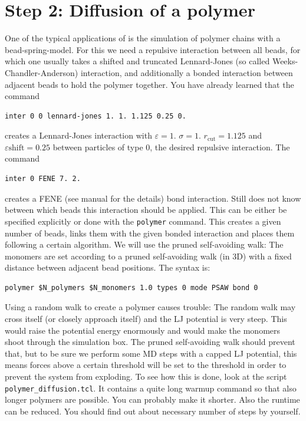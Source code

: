
\section{Step 2: Diffusion of a polymer}
One of the typical applications of \ES{} is the simulation of polymer chains 
with a bead-spring-model. For this we need a repulsive interaction
between all beads, for which one usually takes a shifted and truncated
Lennard-Jones (so called Weeks-Chandler-Anderson) interaction, 
and additionally a bonded interaction between 
adjacent beads to hold the polymer together. You have already learned
that the command
{\vspace{0,2cm}\small
\begin{lstlisting}[numbers=none]
inter 0 0 lennard-jones 1. 1. 1.125 0.25 0. 
\end{lstlisting}\vspace{0,2cm}
}
creates a Lennard-Jones interaction with $\varepsilon=1.$ $\sigma=1.$
$r_\text{cut} = 1.125$ and $\varepsilon\text{shift}=0.25$ between particles
of type 0, the desired 
repulsive interaction. The command
{\vspace{0,2cm}\small
\begin{lstlisting}[numbers=none]
inter 0 FENE 7. 2. 
\end{lstlisting}\vspace{0,2cm}
}
creates a FENE (see \ES{} manual for the details) bond interaction. Still \ES{}
does not know between which beads this interaction should be applied.
This can be either be specified explicitly or done with the \lstinline|polymer|
command. This creates a given number of beads, links them with the given
bonded interaction and places them following a certain algorithm. We will
use the pruned self-avoiding walk: The monomers are set according 
to a pruned self-avoiding walk (in 3D) with a
fixed distance between adjacent bead positions. The syntax is:
{\vspace{0,2cm}\small
\begin{lstlisting}[numbers=none]
polymer $N_polymers $N_monomers 1.0 types 0 mode PSAW bond 0 
\end{lstlisting}\vspace{0,2cm}
}
Using a random walk to create a polymer causes trouble: The random walk may 
cross itself (or closely approach itself) and the LJ potential is very
steep. This would raise the potential energy enormously and would make
the monomers shoot through the simulation box. The pruned self-avoiding
walk should prevent that, but to be sure
we perform some MD steps with a capped LJ potential, this means 
forces above a certain threshold will be set to the threshold in order to prevent
the system from exploding. To see how this is done, look at the script 
\lstinline|polymer_diffusion.tcl|.
It contains a quite long warmup command so that also longer polymers
are possible. You can probably make it shorter. Also the runtime
can be reduced. You should find out about necessary number of steps
by yourself.

